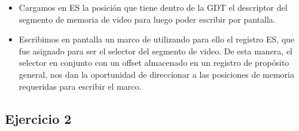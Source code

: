 \begin{itemize}
 \item Cargamos en ES la posici\'on que tiene dentro de la GDT el descriptor del segmento de memoria de video para luego poder escribir por pantalla.
 
 \item Escribimos en pantalla un marco de \* utilizando para ello el registro ES, que fue asignado para ser el selector del segmento de video. De esta manera, el selector en conjunto con un offset almacenado en un registro de prop\'osito general, nos dan la oportunidad de direccionar a las posiciones de memoria requeridas para escribir el marco.
\end{itemize}

\subsection{Ejercicio 2}
